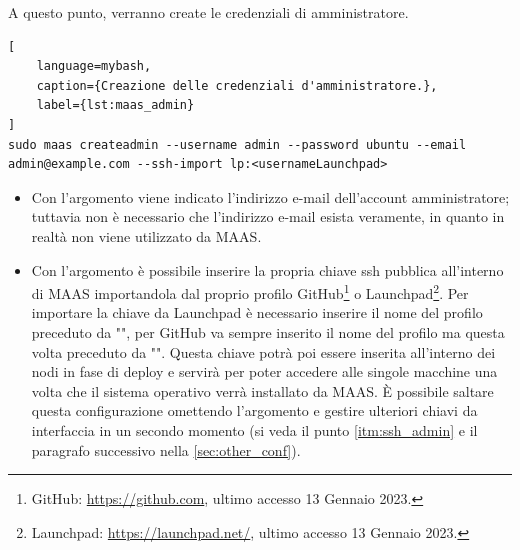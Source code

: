 \bigskip
\noindent
A questo punto, verranno create le credenziali di amministratore.
% 
\begin{lstlisting}[
    language=mybash, 
    caption={Creazione delle credenziali d'amministratore.}, 
    label={lst:maas_admin}
]
sudo maas createadmin --username admin --password ubuntu --email admin@example.com --ssh-import lp:<usernameLaunchpad>
\end{lstlisting}
% 
% 
\begin{itemize}
    \item Con l'argomento  viene indicato l'indirizzo e-mail dell'account amministratore;
    tuttavia non è necessario che l'indirizzo e-mail esista veramente, in quanto in realtà non viene utilizzato da MAAS.

    \item Con l'argomento  è possibile inserire la propria chiave ssh pubblica  all'interno di MAAS importandola dal proprio profilo
    GitHub\footnote{GitHub: \url{https://github.com}, ultimo accesso 13 Gennaio 2023.} 
    o
    Launchpad\footnote{Launchpad: \url{https://launchpad.net/}, ultimo accesso 13 Gennaio 2023.}.
    Per importare la chiave da Launchpad è necessario inserire il nome del profilo preceduto da "", per GitHub va sempre inserito il nome del profilo ma questa volta preceduto da "".
    Questa chiave potrà poi essere inserita all'interno dei nodi in fase di deploy e servirà per poter accedere alle singole macchine una volta che il sistema operativo verrà installato da MAAS.
    È possibile saltare questa configurazione omettendo l'argomento e gestire ulteriori chiavi da interfaccia in un secondo momento (si veda il punto \ref{itm:ssh_admin} e il paragrafo successivo nella \cref{sec:other_conf}).
\end{itemize}

